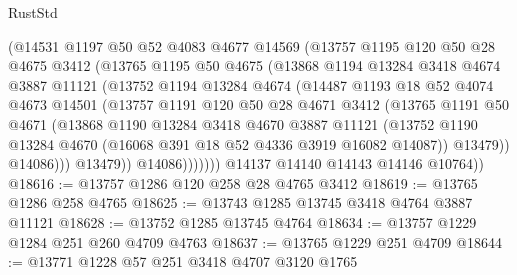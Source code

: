\begin{lexlean}{RustStd}
\begin{coremodule}
                  (@14531
                    @1197
                    @50
                    @52
                    @4083
                    @4677
                    @14569
                    (@13757
                      @1195
                      @120
                      @50
                      @28
                      @4675
                      @3412
                      (@13765
                        @1195
                        @50
                        @4675
                        (@13868
                          @1194
                          @13284
                          @3418
                          @4674
                          @3887
                          @11121
                          (@13752
                            @1194
                            @13284
                            @4674
                            (@14487
                              @1193
                              @18
                              @52
                              @4074
                              @4673
                              @14501
                              (@13757
                                @1191
                                @120
                                @50
                                @28
                                @4671
                                @3412
                                (@13765
                                  @1191
                                  @50
                                  @4671
                                  (@13868
                                    @1190
                                    @13284
                                    @3418
                                    @4670
                                    @3887
                                    @11121
                                    (@13752
                                      @1190
                                      @13284
                                      @4670
                                      (@16068 @391 @18 @52 @4336 @3919 @16082 @14087))
                                    @13479))
                                @14086)))
                          @13479))
                      @14086)))))))
        @14137
        @14140
        @14143
        @14146
        @10764))
@18616 := @13757 @1286 @120 @258 @28 @4765 @3412
@18619 := @13765 @1286 @258 @4765
@18625 := @13743 @1285 @13745 @3418 @4764 @3887 @11121
@18628 := @13752 @1285 @13745 @4764
@18634 := @13757 @1229 @1284 @251 @260 @4709 @4763
@18637 := @13765 @1229 @251 @4709
@18644 := @13771 @1228 @57 @251 @3418 @4707 @3120 @1765

\end{coremodule}
\end{lexlean}
